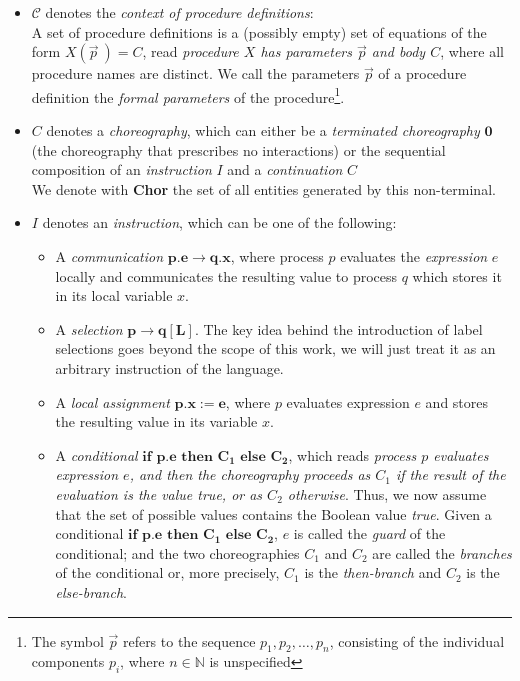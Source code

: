 \documentclass[12pt,a4paper,twoside]{book}
\begin{document}
\begin{itemize}
\item $\mathscr{C}$ denotes the \textit{context of procedure definitions}:\\
	A set of procedure definitions is a (possibly empty) set of equations of the form $X(\vec{p}~) = C$, read \textit{procedure $X$ has parameters $\vec{p}$ and body $C$}, where all procedure names are distinct. We call the parameters $\vec{p}$ of a procedure definition the \textit{formal parameters} of the procedure\footnote{The symbol \( \vec{p} \) refers to the sequence \( p_1, p_2, \dots, p_n \), consisting of the individual components \( p_i \), where \( n \in \mathbb{N} \) is unspecified}.
\item $C$ denotes a \textit{choreography}, which can either be a \textit{terminated choreography} $\boldsymbol{0}$ (the choreography that prescribes no interactions) or the sequential composition of an \textit{instruction} $I$ and a \textit{continuation} $C$\\
We denote with \textbf{Chor} the set of all entities generated by this non-terminal.
\item $I$ denotes an \textit{instruction}, which can be one of the following:
\begin{itemize}
	\item A \emph{communication} $\bm{p.e \rightarrow q.x}$, where process $p$ evaluates the \emph{expression} $e$ locally and communicates the resulting value to process $q$ which stores it in its local variable $x$.
	\item A \emph{selection} $\bm{p \rightarrow q[L]}$. The key idea behind the introduction of label selections goes beyond the scope of this work, we will just treat it as an arbitrary instruction of the language.
	\item A \emph{local assignment} $\bm{p.x := e}$, where $p$ evaluates expression $e$ and stores the resulting value in its variable $x$.
	\item A \emph{conditional} $\bm{\textbf{if } p.e \textbf{ then } C_1 \textbf{ else } C_2}$, which reads \textit{process $p$ evaluates expression $e$, and then the choreography proceeds as $C_1$ if the result of the evaluation is the value \textit{true}, or as $C_2$ otherwise}. Thus, we now assume that the set of possible values contains the Boolean value \textit{true}. Given a conditional $\bm{\textbf{if } p.e \textbf{ then } C_1 \textbf{ else } C_2}$, $e$ is called the \textit{guard} of the conditional; and the two choreographies $C_1$ and $C_2$ are called the \textit{branches} of the conditional or, more precisely, $C_1$ is the \textit{then-branch} and $C_2$ is the \textit{else-branch}.

\end{itemize}
\end{itemize}
\end{document}
